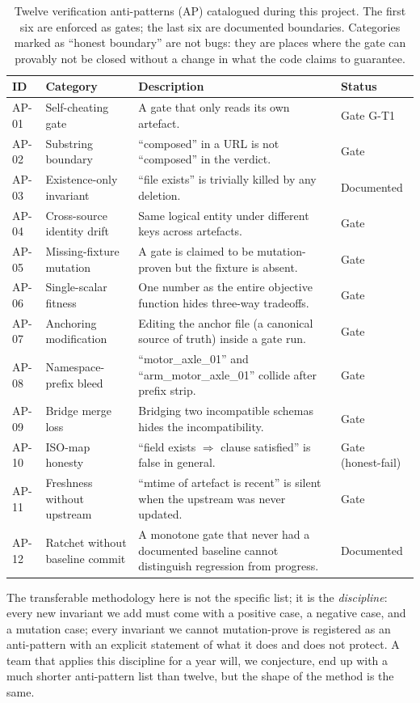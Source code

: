 \documentclass[review]{elsarticle}
\begin{document}
\begin{table}[h]
\centering
\caption{Twelve verification anti-patterns (AP) catalogued during this
project. The first six are enforced as gates; the last six are
documented boundaries. Categories marked as ``honest boundary'' are
not bugs: they are places where the gate can provably not be closed
without a change in what the code claims to guarantee.}
\label{tab:ap}
\begin{tabular}{llp{5.5cm}l}
\hline
ID & Category & Description & Status \\
\hline
AP-01 & Self-cheating gate & A gate that only reads its own artefact. & Gate G-T1 \\
AP-02 & Substring boundary & ``composed'' in a URL is not ``composed'' in the verdict. & Gate \\
AP-03 & Existence-only invariant & ``file exists'' is trivially killed by any deletion. & Documented \\
AP-04 & Cross-source identity drift & Same logical entity under different keys across artefacts. & Gate \\
AP-05 & Missing-fixture mutation & A gate is claimed to be mutation-proven but the fixture is absent. & Gate \\
AP-06 & Single-scalar fitness & One number as the entire objective function hides three-way tradeoffs. & Gate \\
AP-07 & Anchoring modification & Editing the anchor file (a canonical source of truth) inside a gate run. & Gate \\
AP-08 & Namespace-prefix bleed & ``motor\_axle\_01'' and ``arm\_motor\_axle\_01'' collide after prefix strip. & Gate \\
AP-09 & Bridge merge loss & Bridging two incompatible schemas hides the incompatibility. & Gate \\
AP-10 & ISO-map honesty & ``field exists $\Rightarrow$ clause satisfied'' is false in general. & Gate (honest-fail) \\
AP-11 & Freshness without upstream & ``mtime of artefact is recent'' is silent when the upstream was never updated. & Gate \\
AP-12 & Ratchet without baseline commit & A monotone gate that never had a documented baseline cannot distinguish regression from progress. & Documented \\
\hline
\end{tabular}
\end{table}

The transferable methodology here is not the specific list; it is the
\emph{discipline}: every new invariant we add must come with a
positive case, a negative case, and a mutation case; every invariant
we cannot mutation-prove is registered as an anti-pattern with an
explicit statement of what it does and does not protect. A team that
applies this discipline for a year will, we conjecture, end up with a
much shorter anti-pattern list than twelve, but the shape of the
method is the same.
\end{document}
